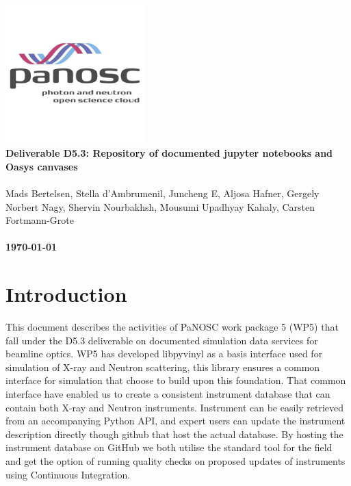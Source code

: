 \documentclass[10pt]{scrartcl}
\begin{document}
\makeatletter
\begin{titlepage}
\thispagestyle{scrheadings}
\ohead{}
\ihead{}
\chead{}
\ifoot{}
\ofoot{}
\noindent%
\includegraphics[width=0.4\textwidth]{figures/PaNOSClogo_web_RGB_512x512.jpg}\\
\Huge{%
\renewcommand{\baselinestretch}{2.0}%
  \textbf{%
    Deliverable D5.3: Repository of documented jupyter notebooks and Oasys canvases\\
  }%
}%
\\
{%
\Large{%
  Mads Bertelsen,
  Stella d'Ambrumenil,
  Juncheng E,
  Aljosa Hafner,
  Gergely Norbert Nagy,
  Shervin Nourbakhsh,
  Mousumi Upadhyay Kahaly,
  Carsten Fortmann-Grote
  \bigskip\\
  \bigskip\\
  \textbf{\today}%
}}%
\end{titlepage}
\makeatother

\section{Introduction}
This document describes the activities of PaNOSC work package 5 (WP5) that fall under the D5.3 deliverable on documented simulation data services for beamline optics. WP5 has developed libpyvinyl as a basis interface used for simulation of X-ray and Neutron scattering, this library ensures a common interface for simulation that choose to build upon this foundation. That common interface have enabled us to create a consistent instrument database that can contain both X-ray and Neutron instruments. Instrument can be easily retrieved from an accompanying Python API, and expert users can update the instrument description directly though github that host the actual database. By hosting the instrument database on GitHub we both utilise the standard tool for the field and get the option of running quality checks on proposed updates of instruments using Continuous Integration.
\end{document}

